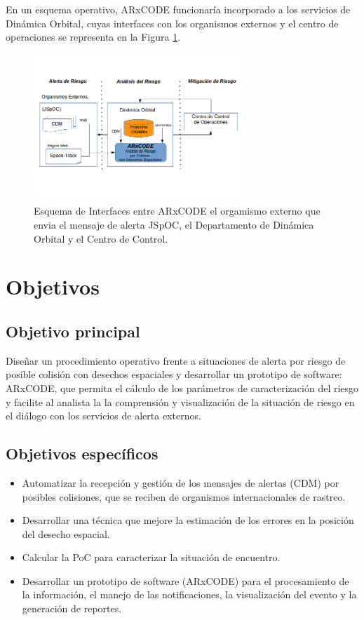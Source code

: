 En un esquema operativo, ARxCODE funcionar\'ia incorporado a los servicios de Din\'amica Orbital, cuyas interfaces con los organismos externos y el centro de operaciones se representa en la Figura \ref{fig:arcodeInterface}.\\ 


\begin{figure}[!h]
\centering
  \includegraphics[width=0.7\textwidth]{imagenes/interfasessistemas}
  \caption[Interfaces del ARxCODE]{Esquema de Interfaces entre ARxCODE el orgamismo externo que envia el mensaje de alerta JSpOC, el Departamento de Din\'amica Orbital y el Centro de Control.}
  \label{fig:arcodeInterface}
\end{figure}



\section{Objetivos}

\subsection*{Objetivo principal}
Dise\~nar un procedimiento operativo frente a situaciones de alerta por riesgo de posible
colisi\'on con desechos espaciales y desarrollar un prototipo de software: ARxCODE, que
permita el c\'alculo de los par\'ametros de caracterizaci\'on del riesgo y facilite al analista la
la comprensi\'on y visualizaci\'on de la situaci\'on de riesgo en el di\'alogo con los servicios de alerta externos.\\

\subsection*{Objetivos espec\'ificos}
\begin{itemize}
\item Automatizar la recepci\'on y gesti\'on de los mensajes de alertas (CDM) por posibles
colisiones, que se reciben de organismos internacionales de rastreo.
\item Desarrollar una t\'ecnica que mejore la estimaci\'on de los errores en la posici\'on del desecho espacial.
\item Calcular la \ac{PoC} para caracterizar la situaci\'on de encuentro.
\item Desarrollar un prototipo de software (ARxCODE) para el procesamiento de la informaci\'on, el manejo de las notificaciones, la visualizaci\'on del evento y la generaci\'on de reportes.
\end{itemize}

